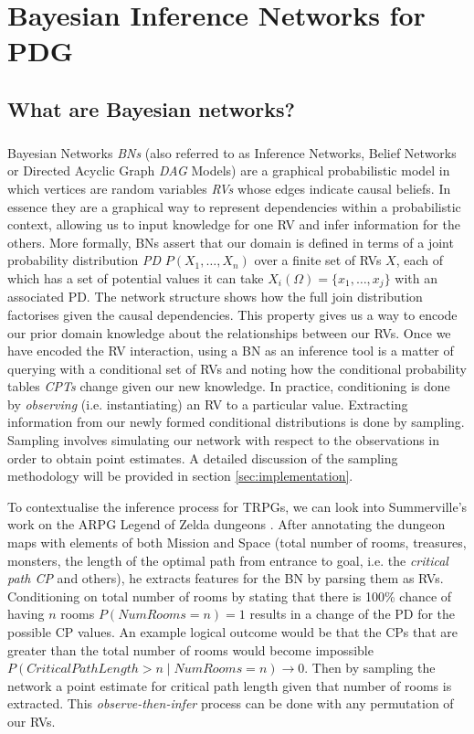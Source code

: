 \documentclass{UoYCSproject}
\begin{document}
\chapter{Bayesian Inference Networks for PDG}
\label{ch:BNETS}

\section{What are Bayesian networks?}
\paragraph{}
Bayesian Networks \textit{BNs} \parencite{pearl1985bayesian} (also referred to as Inference Networks, Belief Networks or Directed Acyclic Graph \textit{DAG} Models) are a graphical probabilistic model in which vertices are random variables \textit{RVs} whose edges indicate causal beliefs. In essence they are a graphical way to represent dependencies within a probabilistic context, allowing us to input knowledge for one RV and infer information for the others. More formally, BNs assert that our domain is defined in terms of a joint probability distribution \textit{PD} \(P(X_1, \ldots , X_n)\) over a finite set of RVs \(X\), each of which has a set of potential values it can take \(X_i(\Omega) = \{x_1, \ldots, x_j\}\) with an associated PD. The network structure shows how the full join distribution factorises given the causal dependencies. This property gives us a way to encode our prior domain knowledge about the relationships between our RVs.
Once we have encoded the RV interaction, using a BN as an inference tool is a matter of querying with a conditional set of RVs and noting how the conditional probability tables \textit{CPTs} change given our new knowledge. In practice, conditioning is done by \textit{observing} (i.e. instantiating) an RV to a particular value. Extracting information from our newly formed conditional distributions is done by sampling. Sampling involves simulating our network with respect to the observations in order to obtain point estimates. A detailed discussion of the sampling methodology will be provided in section \ref{sec:implementation}.

To contextualise the inference process for TRPGs, we can look into Summerville's work on the ARPG Legend of Zelda dungeons \parencite{SummervilleLearningOfZelda}. After annotating the dungeon maps with elements of both Mission and Space (total number of rooms, treasures, monsters, the length of the optimal path from entrance to goal, i.e. the \textit{critical path CP} and others), he extracts features for the BN by parsing them as RVs. Conditioning on total number of rooms by stating that there is 100\% chance of having \(n\) rooms \(P(NumRooms = n) = 1\) results in a change of the PD for the possible CP values. An example logical outcome would be that the CPs that are greater than the total number of rooms would become impossible \(P(CriticalPathLength > n \mid NumRooms = n) \rightarrow 0 \). Then by sampling the network a point estimate for critical path length given that number of rooms is extracted. This \textit{observe-then-infer} process can be done with any permutation of our RVs.
\end{document}
